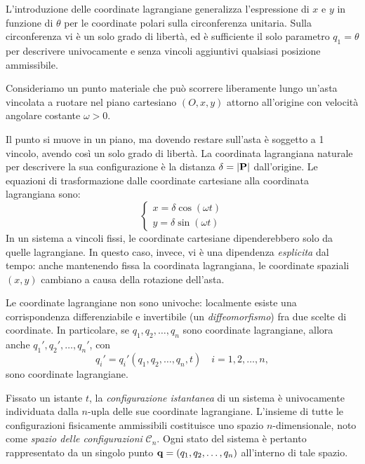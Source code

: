 \begin{remark}
    L'introduzione delle coordinate lagrangiane generalizza l'espressione di $x$ e $y$ in funzione di $\theta$ per le coordinate polari sulla circonferenza unitaria. Sulla circonferenza vi è un solo grado di libertà, ed è sufficiente il solo parametro $q_1 = \theta$ per descrivere univocamente e senza vincoli aggiuntivi qualsiasi posizione ammissibile.
\end{remark}

\begin{example}\label{ex:guida_ruotante}
Consideriamo un punto materiale che può scorrere liberamente lungo un'asta vincolata a ruotare nel piano cartesiano $(O, x, y)$ attorno all'origine con velocità angolare costante $\omega > 0$. 

Il punto si muove in un piano, ma dovendo restare sull'asta è soggetto a 1 vincolo, avendo così un solo grado di libertà. La coordinata lagrangiana naturale per descrivere la sua configurazione è la distanza $\delta = \abs{\vb{P}}$ dall'origine. Le equazioni di trasformazione dalle coordinate cartesiane alla coordinata lagrangiana sono:
\begin{equation*}
    \begin{cases}
        x = \delta \cos(\omega t) \\
        y = \delta \sin(\omega t)
    \end{cases}
\end{equation*}
In un sistema a vincoli fissi, le coordinate cartesiane dipenderebbero solo da quelle lagrangiane. In questo caso, invece, vi è una dipendenza \emph{esplicita} dal tempo: anche mantenendo fissa la coordinata lagrangiana, le coordinate spaziali $(x,y)$ cambiano a causa della rotazione dell'asta.
\end{example}

\begin{remark}
Le coordinate lagrangiane non sono univoche: localmente esiste una corrispondenza differenziabile e invertibile (un \emph{diffeomorfismo}) fra due scelte di coordinate. In particolare, se $q_1, q_2, \dots, q_n$ sono coordinate lagrangiane, allora anche $q_1', q_2', \dots, q_n'$, con
\begin{equation*}
    q_i' = q_i'(q_1, q_2, \dots, q_n, t) \quad i = 1, 2, \dots, n,
\end{equation*}
sono coordinate lagrangiane.
\end{remark}

\begin{definition}
    Fissato un istante $t$, la \emph{configurazione istantanea} di un sistema è univocamente individuata dalla $n$-upla delle sue coordinate lagrangiane. L'insieme di tutte le configurazioni fisicamente ammissibili costituisce uno spazio $n$-dimensionale, noto come \emph{spazio delle configurazioni} $\mathcal{C}_n$. Ogni stato del sistema è pertanto rappresentato da un singolo punto $\vb{q} = (q_1, q_2, \dots, q_n)$ all'interno di tale spazio.
\end{definition}

